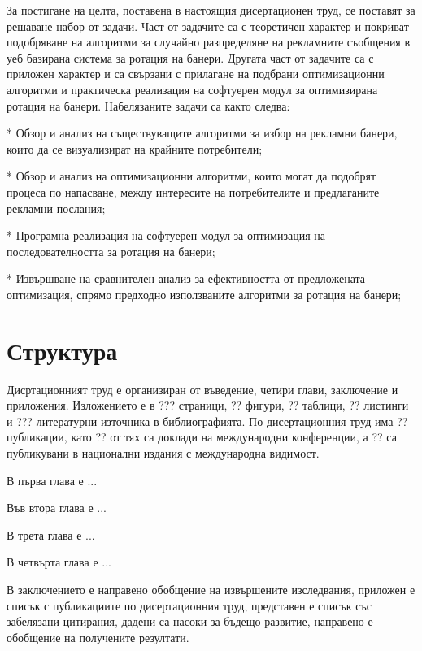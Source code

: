 За постигане на целта, поставена в настоящия дисертационен труд, се поставят за решаване набор от задачи. Част от задачите са с теоретичен характер и покриват подобряване на алгоритми за случайно разпределяне на рекламните съобщения в уеб базирана система за ротация на банери. Другата част от задачите са с приложен характер и са свързани с прилагане на подбрани оптимизационни алгоритми и практическа реализация на софтуерен модул за оптимизирана ротация на банери. Набелязаните задачи са както следва:

* Обзор и анализ на съществуващите алгоритми за избор на рекламни банери, които да се визуализират на крайните потребители;

* Обзор и анализ на оптимизационни алгоритми, които могат да подобрят процеса по напасване, между интересите на потребителите и предлаганите рекламни послания;

* Програмна реализация на софтуерен модул за оптимизация на последователността за ротация на банери;

* Извършване на сравнителен анализ за ефективността от предложената оптимизация, спрямо предходно използваните алгоритми за ротация на банери;

\section*{Структура}

Дисртационният труд е организиран от въведение, четири глави, заключение и приложения. Изложението е в ??? страници, ?? фигури, ?? таблици, ?? листинги и ??? литературни източника в библиографията. По дисертационния труд има ?? публикации, като ?? от тях са доклади на международни конференции, а ?? са публикувани в национални издания с международна видимост. 

В първа глава е ...

Във втора глава е ...

В трета глава е ...

В четвърта глава е ...

В заключението е направено обобщение на извършените изследвания, приложен е списък с публикациите по дисертационния труд, представен е списък със забелязани цитирания, дадени са насоки за бъдещо развитие, направено е обобщение на получените резултати.

